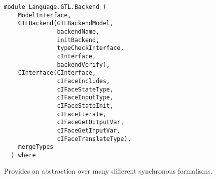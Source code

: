\label{module:Language.GTL.Backend}
\haddockbeginheader
{\haddockverb\begin{verbatim}
module Language.GTL.Backend (
    ModelInterface, 
    GTLBackend(GTLBackendModel,
               backendName,
               initBackend,
               typeCheckInterface,
               cInterface,
               backendVerify), 
    CInterface(CInterface,
               cIFaceIncludes,
               cIFaceStateType,
               cIFaceInputType,
               cIFaceStateInit,
               cIFaceIterate,
               cIFaceGetOutputVar,
               cIFaceGetInputVar,
               cIFaceTranslateType), 
    mergeTypes
  ) where\end{verbatim}}
\haddockendheader

Provides an abstraction over many different synchronous formalisms.
\par

